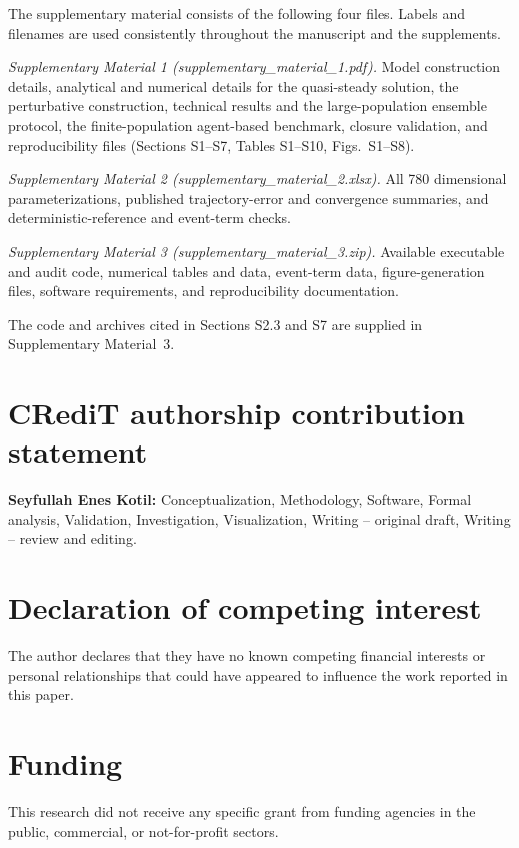 \documentclass[review,12pt]{elsarticle}
\numberwithin{equation}{section}
\theoremstyle{remark}
\begin{document}
The supplementary material consists of the following four files. Labels and
filenames are used consistently throughout the manuscript and the supplements.

\textit{Supplementary Material 1 (supplementary\_material\_1.pdf).} Model
construction details, analytical and numerical details for the quasi-steady
solution, the perturbative construction, technical results and the
large-population ensemble protocol, the finite-population agent-based benchmark,
closure validation, and reproducibility files (Sections S1--S7, Tables
S1--S10, Figs.~S1--S8).

\textit{Supplementary Material 2 (supplementary\_material\_2.xlsx).} All 780
dimensional parameterizations, published trajectory-error and convergence
summaries, and deterministic-reference and event-term checks.

\textit{Supplementary Material 3 (supplementary\_material\_3.zip).} Available
executable and audit code, numerical tables and data, event-term data,
figure-generation files, software requirements, and reproducibility
documentation.

The code and archives cited in Sections S2.3 and S7 are supplied in
Supplementary Material~3.

\section*{CRediT authorship contribution statement}

\textbf{Seyfullah Enes Kotil:} Conceptualization, Methodology, Software,
Formal analysis, Validation, Investigation, Visualization, Writing -- original
draft, Writing -- review and editing.

\section*{Declaration of competing interest}

The author declares that they have no known competing financial interests or
personal relationships that could have appeared to influence the work reported
in this paper.

\section*{Funding}

This research did not receive any specific grant from funding agencies in the
public, commercial, or not-for-profit sectors.
\end{document}
